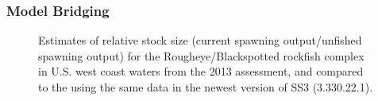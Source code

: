 \documentclass[
]{scrartcl}
\begin{document}
\newpage

\subsubsection{Model Bridging}\label{model-bridging}

\begin{figure}


\caption{\label{fig-RSS_2013}Estimates of relative stock size (current
spawning output/unfished spawning output) for the Rougheye/Blackspotted
rockfish complex in U.S. west coast waters from the 2013 assessment, and
compared to the using the same data in the newest version of SS3
(3.330.22.1).}

\end{figure}%
\end{document}
